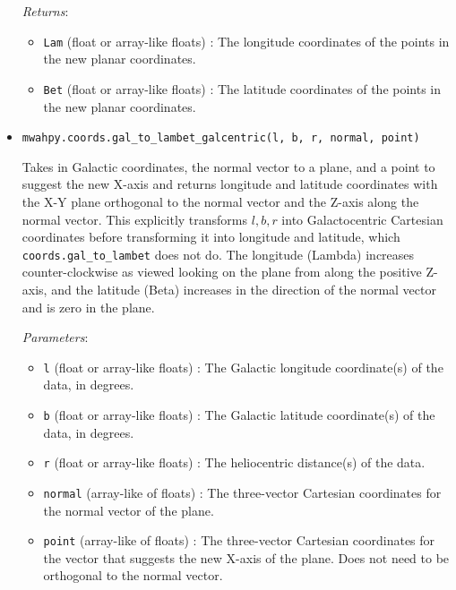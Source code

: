 \documentclass{article}
\begin{document}
\begin{itemize}
\begin{itemize}
\end{itemize}

\textit{Returns}: \begin{itemize}

\item \verb!Lam! (float or array-like floats) : The longitude coordinates of the points in the new planar coordinates.

\item \verb!Bet! (float or array-like floats) : The latitude coordinates of the points in the new planar coordinates.

\end{itemize}



\item \verb!mwahpy.coords.gal_to_lambet_galcentric(l, b, r, normal, point)!

Takes in Galactic coordinates, the normal vector to a plane, and a point to suggest the new X-axis and returns longitude and latitude coordinates with the X-Y plane orthogonal to the normal vector and the Z-axis along the normal vector. This explicitly transforms $l,b,r$ into Galactocentric Cartesian coordinates before transforming it into longitude and latitude, which \verb!coords.gal_to_lambet! does not do. The longitude (Lambda) increases counter-clockwise as viewed looking on the plane from along the positive Z-axis, and the latitude (Beta) increases in the direction of the normal vector and is zero in the plane.

\textit{Parameters}: \begin{itemize}

\item \verb!l! (float or array-like floats) : The Galactic longitude coordinate(s) of the data, in degrees.

\item \verb!b! (float or array-like floats) : The Galactic latitude coordinate(s) of the data, in degrees.

\item \verb!r! (float or array-like floats) : The heliocentric distance(s) of the data.

\item \verb!normal! (array-like of floats) : The three-vector Cartesian coordinates for the normal vector of the plane.

\item \verb!point! (array-like of floats) : The three-vector Cartesian coordinates for the vector that suggests the new X-axis of the plane. Does not need to be orthogonal to the normal vector.


\end{itemize}
\end{itemize}
\end{document}

